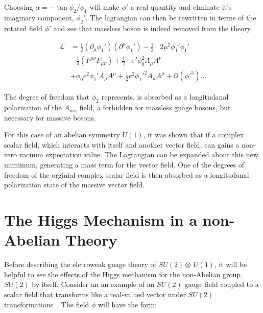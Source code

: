 \noindent Choosing $\alpha = -\tan{\phi_{2}/\phi_{1}}$ will make $\phi'$
 a real quantity and elminate it's imaginary component, $\phi_{2}'$.
 The lagrangian can then be rewritten in terms of the rotated field
 $\phi'$ and see that massless boson is indeed removed from the
 theory.

\begin{equation}\label{eq:abelian_higgs_mechanism_final_lagrangian}
\begin{aligned}
\mathcal{L} & =
\frac{1}{2}(\partial_{\mu}\phi_{1}')(\partial^{\mu}\phi_{1}') -
\frac{1}{2}\cdot~2\mu^{2}\phi_{1}'\phi_{1}' \\
&  -\frac{1}{4}(F^{\mu\nu}F_{\mu\nu}) +
\frac{1}{2}\cdot~e^{2}\phi_{0}^{2}A_{\mu}A^{\nu} \\
&  + \phi_{0}e^{2}\phi_{1}'A_{\mu}A^{\mu} +
\frac{1}{2}e^2\phi_{1}'^{2}A_{\mu}A^{\mu} + \mathcal{O}(\phi'^{3})...
\end{aligned}
\end{equation}

\par The degree of freedom that $\phi_{2}$ represents, is absorbed as
a longitudanal polarization of the $A_{mu}$ field, a forbidden for
massless guage bosons, but necessary for massive bosons.  

\par For this case of an abelian symmetry $U(1)$, it was shown that if a
complex scalar field, which interacts with itself and another vector
field, can gains a non-zero vacuum expectation value.  The Lagrangian can
be expanded about this new mimimum, generating a mass term for the
vector field.  One of the degrees of freedom of the orginial complex
scalar field is then absorbed as a longitudanal polarization state of
the massive vector field.  

\section{The Higgs Mechanism in a non-Abelian Theory}
\label{non_abelian_higgs_mechanism_overview}

\par Before describing the elctroweak guage theory of
$SU(2)\otimes~U(1)$, it will be helpful to see the effects of the
Higgs mechanism for the non-Abelian group, $SU(2)$ by itself.  Consider an
an example of an $SU(2)$ gauge field coupled to a scalar field that
transforms like a real-valued vector under $SU(2)$
transformations~\cite{Peskin_Schroeder}.  The field $\phi$ will have
the form:

